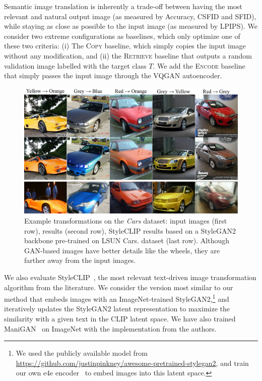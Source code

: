 Semantic image translation is inherently a trade-off between having the most relevant 
and natural output image (as measured by Accuracy, CSFID and SFID), while staying as 
close as possible to the input image (as measured by LPIPS). 
We consider two extreme configurations as baselines,  which only optimize one of these 
two criteria: (i) The  \textsc{Copy} baseline, which simply copies the input image
 without any modification,
and  (ii) the \textsc{Retrieve} baseline that outputs a random validation image 
labelled with the target class $T$.
We add the \textsc{Encode} baseline that simply passes the input image through the 
VQGAN autoencoder. 


\begin{figure}
    \centering
    \vspace{-1em}
    \includegraphics[width=\linewidth]{images/flexit/assets/cars2.pdf}
    \caption{Example  transformations on the \textit{Cars} dataset:  input images (first row),  \ours results  (second row), StyleCLIP results based on a  StyleGAN2 backbone pre-trained on LSUN Cars.
    dataset (last row). Although GAN-based images have better details like the wheels, they are farther away from the input images.}
    
    \label{fig:cars30k}
\end{figure}

We also evaluate  StyleCLIP~\cite{patashnik2021styleclip}, the most relevant 
text-driven image transformation algorithm from the literature. We consider the 
version most similar to our method that embeds images with an ImageNet-trained 
StyleGAN2,\footnote{We used the publicly available model from 
\url{https://github.com/justinpinkney/awesome-pretrained-stylegan2}, and  train our 
own e4e encoder~\cite{tov2021designing} to embed images into this latent space.} and
 iteratively updates the StyleGAN2 latent representation to maximize the similarity
  with a given text in the CLIP latent space. We have also trained 
  ManiGAN~\cite{li2020manigan} on ImageNet with the  implementation from the authors.

